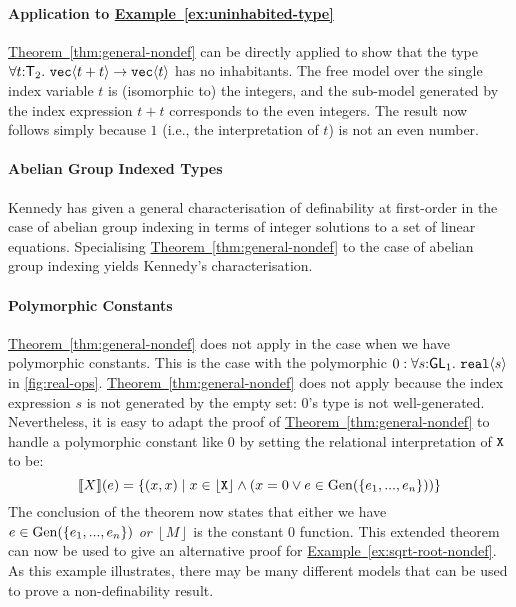 \documentclass{sigplanconf}
\newcommand{\SynGL}[1]{\mathsf{GL}_#1}
\newcommand{\SynTransl}[1]{\mathsf{T}_#1}
\newcommand{\sepbar}{\mathrel|}
\newcommand{\tyPrim}[2]{\textup{\texttt{#1}}\langle #2 \rangle}
\newcommand{\tyPrimNm}[1]{\textup{\texttt{#1}}}
\newcommand{\tySem}[1]{\left\lfloor #1 \right\rfloor}
\newcommand{\tmSem}[1]{\left\lfloor{#1}\right\rfloor}
\newcommand{\rsem}[1]{\llbracket #1 \rrbracket}
\newcommand{\thmref}[1]{\hyperref[#1]{Theorem~\ref*{#1}}}
\newcommand{\exref}[1]{\hyperref[#1]{Example~\ref*{#1}}}
\theoremstyle{examplestyle}
\theoremstyle{restatementstyle}
\begin{document}

\paragraph{Application to \exref{ex:uninhabited-type}}
\thmref{thm:general-nondef} can be directly applied to show that the
type $\forall t\mathord:\SynTransl{2}.~\tyPrim{vec}{t + t} \to
\tyPrim{vec}{t}$ has no inhabitants. The free model over the single
index variable $t$ is (isomorphic to) the integers, and the sub-model
generated by the index expression $t + t$ corresponds to the even
integers. The result now follows simply because $1$ (i.e., the
interpretation of $t$) is not an even number.

\paragraph{Abelian Group Indexed Types} Kennedy
\cite{kennedy97relational} has given a general characterisation of
definability at first-order in the case of abelian group indexing in
terms of integer solutions to a set of linear equations. Specialising
\thmref{thm:general-nondef} to the case of abelian group indexing
yields Kennedy's characterisation.

\paragraph{Polymorphic Constants} \thmref{thm:general-nondef} does not
apply in the case when we have polymorphic constants. This is the case
with the polymorphic $0 : \forall
s\mathord:\SynGL{1}.~\tyPrim{real}{s}$ in
\autoref{fig:real-ops}. \thmref{thm:general-nondef} does not apply
because the index expression $s$ is not generated by the empty set:
$0$'s type is not well-generated. Nevertheless, it is easy to adapt
the proof of \thmref{thm:general-nondef} to handle a polymorphic
constant like $0$ by setting the relational interpretation of
$\tyPrimNm{X}$ to be:
\begin{displaymath}
  \rsem{X}(e) = \{ (x,x) \sepbar x \in \tySem{\tyPrimNm{X}} \land (x = 0 \lor e \in \Gen(\{e_1,...,e_n\})) \}
\end{displaymath}
The conclusion of the theorem now states that either we have $e \in
\mathrm{Gen}(\{e_1,...,e_n\})$ \emph{or} $\tmSem{M}$ is the constant $0$
function. This extended theorem can now be used to give an alternative
proof for \exref{ex:sqrt-root-nondef}. As this example illustrates,
there may be many different models that can be used to prove a
non-definability result.
\end{document}
